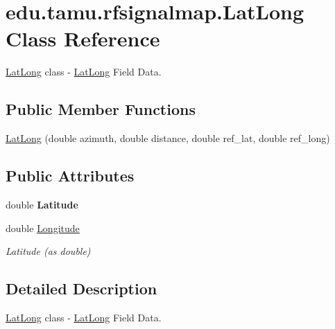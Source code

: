\hypertarget{classedu_1_1tamu_1_1rfsignalmap_1_1_lat_long}{}\section{edu.\+tamu.\+rfsignalmap.\+Lat\+Long Class Reference}
\label{classedu_1_1tamu_1_1rfsignalmap_1_1_lat_long}


\hyperlink{classedu_1_1tamu_1_1rfsignalmap_1_1_lat_long}{Lat\+Long} class -\/ \hyperlink{classedu_1_1tamu_1_1rfsignalmap_1_1_lat_long}{Lat\+Long} Field Data.  


\subsection*{Public Member Functions}
\begin{DoxyCompactItemize}
\item 
\hyperlink{classedu_1_1tamu_1_1rfsignalmap_1_1_lat_long_aa8531a08ae463ad91b989e553e0d324d}{Lat\+Long} (double azimuth, double distance, double ref\+\_\+lat, double ref\+\_\+long)
\end{DoxyCompactItemize}
\subsection*{Public Attributes}
\begin{DoxyCompactItemize}
\item 
double {\bfseries Latitude}\hypertarget{classedu_1_1tamu_1_1rfsignalmap_1_1_lat_long_aa895c0397b69ff043850188e6b6dc0cb}{}\label{classedu_1_1tamu_1_1rfsignalmap_1_1_lat_long_aa895c0397b69ff043850188e6b6dc0cb}

\item 
double \hyperlink{classedu_1_1tamu_1_1rfsignalmap_1_1_lat_long_ab5440c8a786b2455f09752f89baaf065}{Longitude}\hypertarget{classedu_1_1tamu_1_1rfsignalmap_1_1_lat_long_ab5440c8a786b2455f09752f89baaf065}{}\label{classedu_1_1tamu_1_1rfsignalmap_1_1_lat_long_ab5440c8a786b2455f09752f89baaf065}

\begin{DoxyCompactList}\small\item\em Latitude (as double) \end{DoxyCompactList}\end{DoxyCompactItemize}


\subsection{Detailed Description}
\hyperlink{classedu_1_1tamu_1_1rfsignalmap_1_1_lat_long}{Lat\+Long} class -\/ \hyperlink{classedu_1_1tamu_1_1rfsignalmap_1_1_lat_long}{Lat\+Long} Field Data. 

